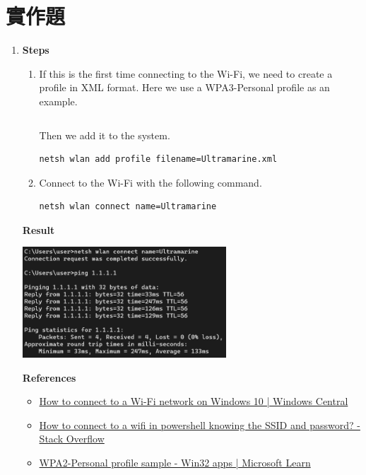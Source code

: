 \documentclass[12pt, a4paper]{article}
\begin{document}
  \section{實作題}
  \begin{enumerate}[label=(\alph*)]
    \item \textbf{Steps}
    \begin{enumerate}[label=(\arabic*)]
      \item If this is the first time connecting to the Wi-Fi, we need to create a profile in
      XML format. Here we use a WPA3-Personal profile as an example.
      \inputminted[fontsize=\footnotesize]{xml}{Ultramarine.xml}
      Then we add it to the system.
      \begin{Verbatim}[frame=single]
netsh wlan add profile filename=Ultramarine.xml
      \end{Verbatim}
      \item Connect to the Wi-Fi with the following command.
      \begin{Verbatim}[frame=single]
netsh wlan connect name=Ultramarine
      \end{Verbatim}
    \end{enumerate}
    \textbf{Result}

    \includegraphics[width=0.6\textwidth]{4-a_netsh.png}

    \textbf{References}
    \begin{itemize}
      \item \href{https://www.windowscentral.com/how-connect-wi-fi-network-windows-10}{How to connect to a Wi-Fi network on Windows 10 | Windows Central}
      \item \href{https://stackoverflow.com/questions/32760356/how-to-connect-to-a-wifi-in-powershell-knowing-the-ssid-and-password}{How to connect to a wifi in powershell knowing the SSID and password? - Stack Overflow}
      \item \href{https://learn.microsoft.com/en-us/windows/win32/nativewifi/wpa2-personal-profile-sample}{WPA2-Personal profile sample - Win32 apps | Microsoft Learn}
    \end{itemize}


\end{enumerate}
\end{document}
